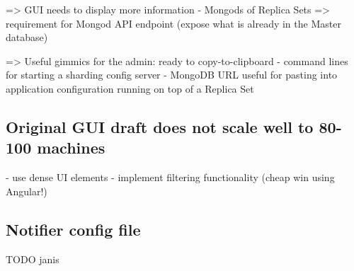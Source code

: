 => GUI needs to display more information
    - Mongods of Replica Sets
    => requirement for Mongod API endpoint (expose what is already in the Master database)

=> Useful gimmics for the admin: ready to copy-to-clipboard 
    - command lines for starting a sharding config server
    - MongoDB URL useful for pasting into application configuration running on top of a Replica Set

\subsection{Original GUI draft does not scale well to 80-100 machines }

- use dense UI elements
- implement filtering functionality (cheap win using Angular!)

\subsection{Notifier config file}

TODO janis
